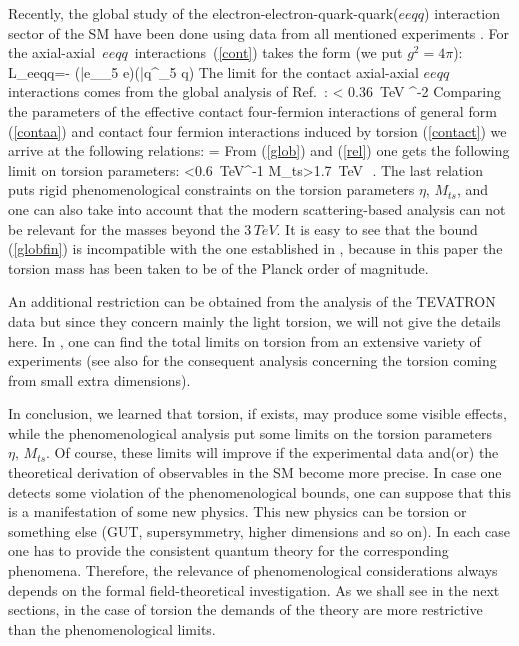 Recently, the global study of the
electron-electron-quark-quark($eeqq$) interaction sector of the
SM have been done using data from all mentioned 
experiments \cite{global}. For the axial-axial
$\,eeqq\,$ interactions~(\ref{cont}) takes the form (we put $g^2=4\pi$):
\beq
L_{eeqq}=-
(\bar e\gamma_\mu\gamma_5 e)(\bar q\gamma^\mu \gamma_5 q)
\label{contaa}
\eeq
The limit for the contact axial-axial $eeqq$ interactions comes
from the global analysis of Ref.~\cite{global}:
\beq
{} < 0.36\mbox{ TeV} ^{-2}
\label{glob}
\eeq
Comparing the parameters of the effective contact four-fermion
interactions of general form
(\ref{contaa}) and contact four fermion interactions induced by
torsion (\ref{contact}) we arrive at the following relations:
\beq
{}=
\label{rel}
\eeq
From (\ref{glob}) and (\ref{rel}) one gets the following limit
on torsion parameters:
\beq
{}<0.6\mbox{ TeV}^{-1}\; \Rightarrow \;
M_{ts}>1.7\mbox{ TeV }\cdot\eta\,.
\label{globfin}
\eeq
The last relation puts rigid phenomenological constraints 
on the torsion parameters $\eta,\,M_{ts}$, and one can also 
take into account that the modern scattering-based analysis 
can not be relevant for the masses beyond the $3\,TeV$. 
It is easy to see that the bound (\ref{globfin}) is incompatible 
with the one established in \cite{hammond}, because in this
paper the torsion mass has been taken to be of the Planck order 
of magnitude. 

An additional restriction 
can be obtained from the analysis of the TEVATRON data 
but since they concern mainly the light torsion, we will not 
give the details here. In \cite{betor}, one can find the 
total limits on torsion from an extensive variety of experiments
(see also \cite{extra-dim} for the consequent analysis
concerning the torsion coming from small extra dimensions).

In conclusion, we learned that torsion, if exists, may produce 
some visible effects, while the phenomenological analysis put 
some limits on the torsion parameters $\eta,\,M_{ts}$. Of course, 
these limits will improve if the experimental data and(or) the 
theoretical
derivation of observables in the SM become more precise. In case
one detects some violation of the phenomenological bounds, 
one can suppose that this is a manifestation of some new physics.
This new physics can be torsion or something else (GUT, 
supersymmetry, higher dimensions and so on). In each case one has
to provide the consistent quantum theory for the corresponding 
phenomena. Therefore, the relevance of phenomenological 
considerations always depends on the formal field-theoretical 
investigation. As we shall see in the next sections, in the case 
of torsion the demands of the theory are more restrictive than 
the phenomenological limits. 

